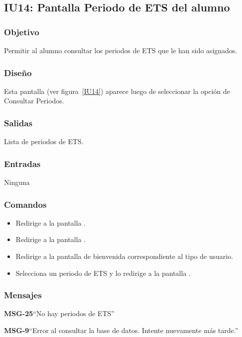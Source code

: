\subsection{IU14: Pantalla Periodo de ETS del alumno}

\subsubsection{Objetivo}
	Permitir al alumno consultar los periodos de ETS que le han sido asignados. 

\subsubsection{Diseño}
	Esta pantalla  (ver figura~\ref{IU14}) aparece luego de seleccionar la opción de Consultar Periodos.


\subsubsection{Salidas}
	Lista de periodos de ETS. 

\subsubsection{Entradas}
Ninguna

\subsubsection{Comandos}

\begin{itemize}
	\item {} Redirige a la pantalla .
	\item {} Redirige a la pantalla .
	\item {} Redirige a la pantalla de bienvenida correspondiente al tipo de usuario.
	\item {} Selecciona un periodo de ETS y lo redirige a la pantalla .
\end{itemize}

\subsubsection{Mensajes}

\begin{Citemize}
	\item {\bf MSG-25}{``No hay periodos de ETS''}
	\item {\bf MSG-9}{``Error al consultar la base de datos. Intente nuevamente más tarde.''}
\end{Citemize}

